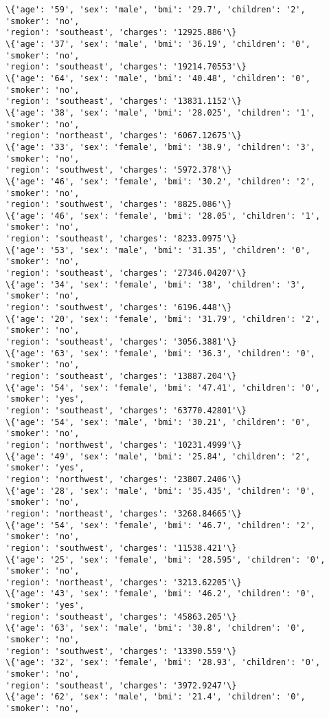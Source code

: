 \documentclass[11pt]{article}
\begin{document}
\begin{Verbatim}[commandchars=\\\{\}]
\{'age': '59', 'sex': 'male', 'bmi': '29.7', 'children': '2', 'smoker': 'no',
'region': 'southeast', 'charges': '12925.886'\}
\{'age': '37', 'sex': 'male', 'bmi': '36.19', 'children': '0', 'smoker': 'no',
'region': 'southeast', 'charges': '19214.70553'\}
\{'age': '64', 'sex': 'male', 'bmi': '40.48', 'children': '0', 'smoker': 'no',
'region': 'southeast', 'charges': '13831.1152'\}
\{'age': '38', 'sex': 'male', 'bmi': '28.025', 'children': '1', 'smoker': 'no',
'region': 'northeast', 'charges': '6067.12675'\}
\{'age': '33', 'sex': 'female', 'bmi': '38.9', 'children': '3', 'smoker': 'no',
'region': 'southwest', 'charges': '5972.378'\}
\{'age': '46', 'sex': 'female', 'bmi': '30.2', 'children': '2', 'smoker': 'no',
'region': 'southwest', 'charges': '8825.086'\}
\{'age': '46', 'sex': 'female', 'bmi': '28.05', 'children': '1', 'smoker': 'no',
'region': 'southeast', 'charges': '8233.0975'\}
\{'age': '53', 'sex': 'male', 'bmi': '31.35', 'children': '0', 'smoker': 'no',
'region': 'southeast', 'charges': '27346.04207'\}
\{'age': '34', 'sex': 'female', 'bmi': '38', 'children': '3', 'smoker': 'no',
'region': 'southwest', 'charges': '6196.448'\}
\{'age': '20', 'sex': 'female', 'bmi': '31.79', 'children': '2', 'smoker': 'no',
'region': 'southeast', 'charges': '3056.3881'\}
\{'age': '63', 'sex': 'female', 'bmi': '36.3', 'children': '0', 'smoker': 'no',
'region': 'southeast', 'charges': '13887.204'\}
\{'age': '54', 'sex': 'female', 'bmi': '47.41', 'children': '0', 'smoker': 'yes',
'region': 'southeast', 'charges': '63770.42801'\}
\{'age': '54', 'sex': 'male', 'bmi': '30.21', 'children': '0', 'smoker': 'no',
'region': 'northwest', 'charges': '10231.4999'\}
\{'age': '49', 'sex': 'male', 'bmi': '25.84', 'children': '2', 'smoker': 'yes',
'region': 'northwest', 'charges': '23807.2406'\}
\{'age': '28', 'sex': 'male', 'bmi': '35.435', 'children': '0', 'smoker': 'no',
'region': 'northeast', 'charges': '3268.84665'\}
\{'age': '54', 'sex': 'female', 'bmi': '46.7', 'children': '2', 'smoker': 'no',
'region': 'southwest', 'charges': '11538.421'\}
\{'age': '25', 'sex': 'female', 'bmi': '28.595', 'children': '0', 'smoker': 'no',
'region': 'northeast', 'charges': '3213.62205'\}
\{'age': '43', 'sex': 'female', 'bmi': '46.2', 'children': '0', 'smoker': 'yes',
'region': 'southeast', 'charges': '45863.205'\}
\{'age': '63', 'sex': 'male', 'bmi': '30.8', 'children': '0', 'smoker': 'no',
'region': 'southwest', 'charges': '13390.559'\}
\{'age': '32', 'sex': 'female', 'bmi': '28.93', 'children': '0', 'smoker': 'no',
'region': 'southeast', 'charges': '3972.9247'\}
\{'age': '62', 'sex': 'male', 'bmi': '21.4', 'children': '0', 'smoker': 'no',

\end{Verbatim}
\end{document}
